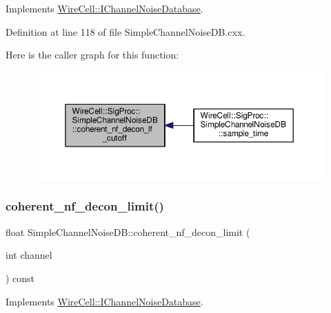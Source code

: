 Implements \hyperlink{class_wire_cell_1_1_i_channel_noise_database_a4104509a65ce9fe5a77fac6ddd39ec56}{Wire\+Cell\+::\+I\+Channel\+Noise\+Database}.



Definition at line 118 of file Simple\+Channel\+Noise\+D\+B.\+cxx.

Here is the caller graph for this function\+:
\nopagebreak
\begin{figure}[H]
\begin{center}
\leavevmode
\includegraphics[width=350pt]{class_wire_cell_1_1_sig_proc_1_1_simple_channel_noise_d_b_a52def69ce297e7fc097b91a4472cbc25_icgraph}
\end{center}
\end{figure}
\mbox{\label{class_wire_cell_1_1_sig_proc_1_1_simple_channel_noise_d_b_a602938fd9dbdd7fe8093231a1d5c5d5a}} 
\subsubsection{\texorpdfstring{coherent\+\_\+nf\+\_\+decon\+\_\+limit()}{coherent\_nf\_decon\_limit()}}
{\footnotesize\ttfamily float Simple\+Channel\+Noise\+D\+B\+::coherent\+\_\+nf\+\_\+decon\+\_\+limit (\begin{DoxyParamCaption}\item[{int}]{channel }\end{DoxyParamCaption}) const\hspace{0.3cm}{\ttfamily [virtual]}}



Implements \hyperlink{class_wire_cell_1_1_i_channel_noise_database_af1b0da30d4aa280deca52a84a9a6326d}{Wire\+Cell\+::\+I\+Channel\+Noise\+Database}.




